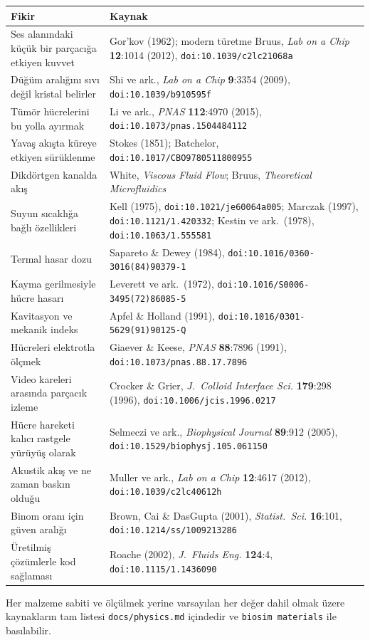 \documentclass[11pt,a4paper]{article}
\begin{document}
\begin{center}\small
\begin{tabular}{p{4.9cm}p{9.5cm}}
\toprule
\textbf{Fikir} & \textbf{Kaynak} \\
\midrule
Ses alanındaki küçük bir parçacığa etkiyen kuvvet &
Gor'kov (1962); modern türetme Bruus, \emph{Lab on a Chip} \textbf{12}:1014
(2012), \texttt{doi:10.1039/c2lc21068a} \\[4pt]
Düğüm aralığını sıvı değil kristal belirler &
Shi ve ark., \emph{Lab on a Chip} \textbf{9}:3354 (2009),
\texttt{doi:10.1039/b910595f} \\[4pt]
Tümör hücrelerini bu yolla ayırmak &
Li ve ark., \emph{PNAS} \textbf{112}:4970 (2015),
\texttt{doi:10.1073/pnas.1504484112} \\[4pt]
Yavaş akışta küreye etkiyen sürüklenme &
Stokes (1851); Batchelor, \texttt{doi:10.1017/CBO9780511800955} \\[4pt]
Dikdörtgen kanalda akış &
White, \emph{Viscous Fluid Flow}; Bruus, \emph{Theoretical Microfluidics} \\[4pt]
Suyun sıcaklığa bağlı özellikleri &
Kell (1975), \texttt{doi:10.1021/je60064a005}; Marczak (1997),
\texttt{doi:10.1121/1.420332}; Kestin ve ark.\ (1978),
\texttt{doi:10.1063/1.555581} \\[4pt]
Termal hasar dozu &
Sapareto \& Dewey (1984), \texttt{doi:10.1016/0360-3016(84)90379-1} \\[4pt]
Kayma gerilmesiyle hücre hasarı &
Leverett ve ark.\ (1972), \texttt{doi:10.1016/S0006-3495(72)86085-5} \\[4pt]
Kavitasyon ve mekanik indeks &
Apfel \& Holland (1991), \texttt{doi:10.1016/0301-5629(91)90125-Q} \\[4pt]
Hücreleri elektrotla ölçmek &
Giaever \& Keese, \emph{PNAS} \textbf{88}:7896 (1991),
\texttt{doi:10.1073/pnas.88.17.7896} \\[4pt]
Video kareleri arasında parçacık izleme &
Crocker \& Grier, \emph{J.\ Colloid Interface Sci.} \textbf{179}:298 (1996),
\texttt{doi:10.1006/jcis.1996.0217} \\[4pt]
Hücre hareketi kalıcı rastgele yürüyüş olarak &
Selmeczi ve ark., \emph{Biophysical Journal} \textbf{89}:912 (2005),
\texttt{doi:10.1529/biophysj.105.061150} \\[4pt]
Akustik akış ve ne zaman baskın olduğu &
Muller ve ark., \emph{Lab on a Chip} \textbf{12}:4617 (2012),
\texttt{doi:10.1039/c2lc40612h} \\[4pt]
Binom oranı için güven aralığı &
Brown, Cai \& DasGupta (2001), \emph{Statist.\ Sci.} \textbf{16}:101,
\texttt{doi:10.1214/ss/1009213286} \\[4pt]
Üretilmiş çözümlerle kod sağlaması &
Roache (2002), \emph{J.\ Fluids Eng.} \textbf{124}:4,
\texttt{doi:10.1115/1.1436090} \\
\bottomrule
\end{tabular}
\end{center}

\vspace{1cm}
\begin{center}
\small\color{muted}
Her malzeme sabiti ve ölçülmek yerine varsayılan her değer dahil olmak üzere
kaynakların tam listesi \texttt{docs/physics.md} içindedir ve
\texttt{biosim materials} ile basılabilir.
\end{center}
\end{document}
